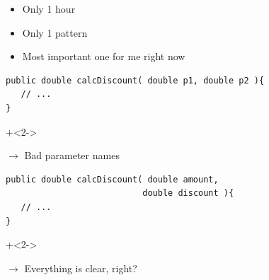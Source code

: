 \begin{frame}[fragile]{}

\begin{itemize}
\item Only 1 hour
\item Only 1 pattern
\vspace{1em}
\item Most important one for me right now
\end{itemize}

\end{frame}



\begin{frame}[fragile]{}

\begin{lstlisting}
public double calcDiscount( double p1, double p2 ){
   // ...
}
\end{lstlisting}

\onslide+<2->

\vspace{2em}

$\longrightarrow$ Bad parameter names

\end{frame}

\begin{frame}[fragile]{}

\begin{lstlisting}
public double calcDiscount( double amount, 
                           double discount ){
   // ...
}
\end{lstlisting}

\onslide+<2->

\vspace{2em}

$\longrightarrow$ Everything is clear, right?

\end{frame}


